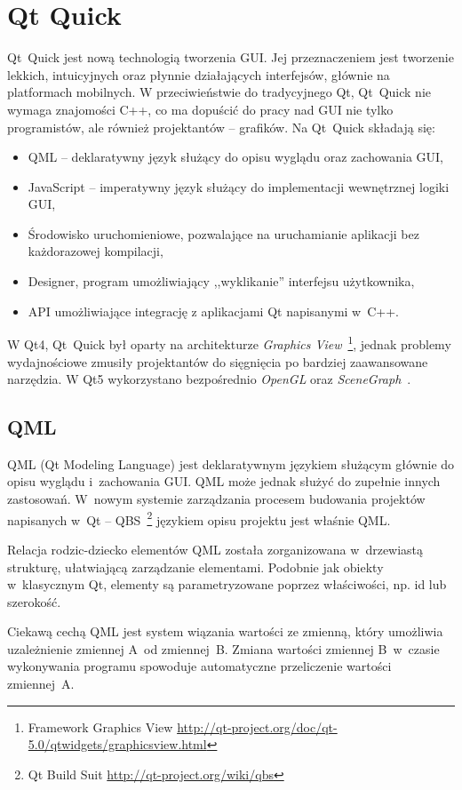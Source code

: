 \section{Qt Quick}
Qt~Quick jest nową technologią tworzenia GUI. Jej przeznaczeniem jest tworzenie lekkich, intuicyjnych oraz płynnie działających interfejsów, głównie na platformach mobilnych. W przeciwieństwie do tradycyjnego Qt, Qt~Quick nie wymaga znajomości C++, co ma dopuścić do pracy nad GUI nie tylko programistów, ale również projektantów -- grafików.
Na Qt~Quick składają się:
\begin{itemize}
\item QML -- deklaratywny język służący do opisu wyglądu oraz zachowania GUI,
\item JavaScript -- imperatywny język służący do implementacji wewnętrznej logiki GUI,
\item Środowisko uruchomieniowe, pozwalające na uruchamianie aplikacji bez każdorazowej kompilacji,
\item Designer, program umożliwiający ,,wyklikanie'' interfejsu użytkownika,
\item API umożliwiające integrację z aplikacjami Qt napisanymi w~C++.
\end{itemize}

W Qt4, Qt~Quick był oparty na architekturze \textit{Graphics View}~\footnote{Framework Graphics View  \url{http://qt-project.org/doc/qt-5.0/qtwidgets/graphicsview.html}}, jednak problemy wydajnościowe zmusiły projektantów do sięgnięcia po bardziej zaawansowane narzędzia. W Qt5 wykorzystano bezpośrednio \textit{OpenGL} oraz \textit{SceneGraph}~\cite{Scene:Graph}.

\subsection{QML}
QML (Qt Modeling Language) jest deklaratywnym językiem służącym głównie do opisu wyglądu i~zachowania GUI. QML może jednak służyć do zupełnie innych zastosowań. W~nowym systemie zarządzania procesem budowania projektów napisanych w~Qt -- QBS~\footnote{Qt Build Suit \url{http://qt-project.org/wiki/qbs}} językiem opisu projektu jest właśnie QML.

Relacja rodzic-dziecko elementów QML została zorganizowana w~drzewiastą strukturę, ułatwiającą zarządzanie elementami. Podobnie jak obiekty w~klasycznym Qt, elementy są parametryzowane poprzez  właściwości, np. id lub szerokość. 

Ciekawą cechą QML jest system wiązania wartości ze zmienną, który umożliwia uzależnienie zmiennej A~od zmiennej~B. Zmiana wartości zmiennej B~w~czasie wykonywania programu spowoduje automatyczne przeliczenie wartości zmiennej~A.

